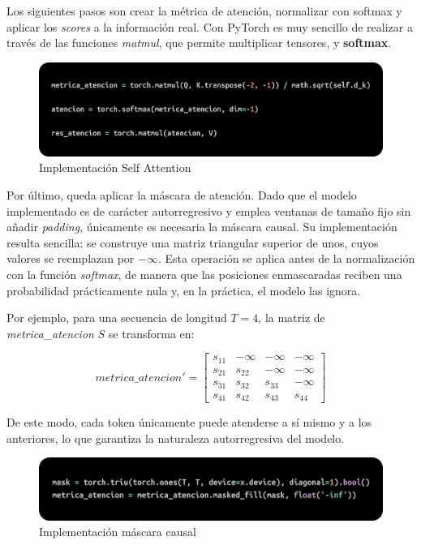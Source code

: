 \documentclass[11pt]{book}
\begin{document}
Los siguientes pasos son crear la métrica de atención, normalizar con softmax y aplicar los \textit{scores} a la información real. Con PyTorch es muy sencillo de realizar a través de las funciones \textit{matmul}, que permite multiplicar tensores, y \textbf{softmax}. 

\begin{figure}[h]
    \centering
    \includegraphics[width=0.5\linewidth]{img/atencion.png}
    \caption{Implementación Self Attention}
    \label{fig:placeholder9}
\end{figure}

Por último, queda aplicar la máscara de atención. Dado que el modelo implementado es de carácter autorregresivo y emplea ventanas de tamaño fijo sin añadir \textit{padding}, únicamente es necesaria la máscara causal. Su implementación resulta sencilla: se construye una matriz triangular superior de unos, cuyos valores se reemplazan por $-\infty$. Esta operación se aplica antes de la normalización con la función \textit{softmax}, de manera que las posiciones enmascaradas reciben una probabilidad prácticamente nula y, en la práctica, el modelo las ignora.  

Por ejemplo, para una secuencia de longitud $T=4$, la matriz de \textit{metrica\_atencion} $S$ se transforma en:  

\[
metrica\_atencion' =
\begin{bmatrix}
s_{11} & -\infty & -\infty & -\infty \\
s_{21} & s_{22} & -\infty & -\infty \\
s_{31} & s_{32} & s_{33} & -\infty \\
s_{41} & s_{42} & s_{43} & s_{44}
\end{bmatrix}
\]

De este modo, cada token únicamente puede atenderse a sí mismo y a los anteriores, lo que garantiza la naturaleza autorregresiva del modelo.

\begin{figure}[h]
    \centering
    \includegraphics[width=0.5\linewidth]{img/masked.png}
    \caption{Implementación máscara causal}
    \label{fig:placeholder10}
\end{figure}
\end{document}
